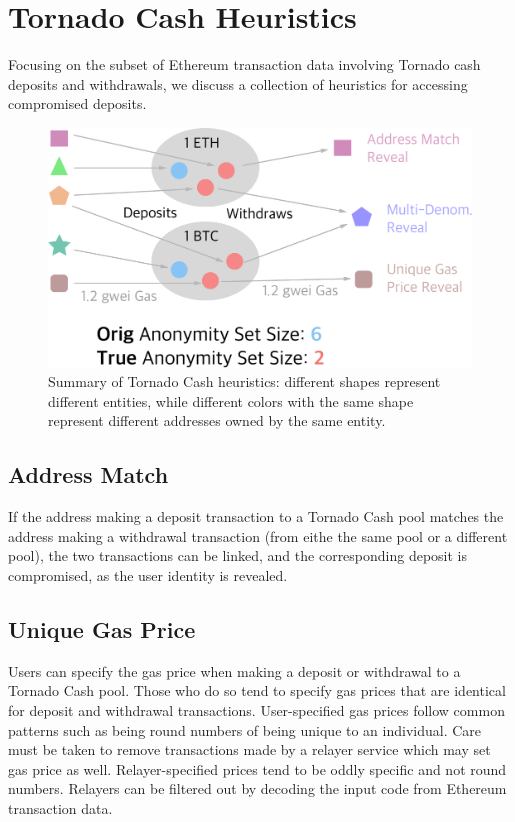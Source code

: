 \documentclass[11pt,a4paper]{article}
\begin{document}
\section{Tornado Cash Heuristics}
\label{sec:tornado}

Focusing on the subset of Ethereum transaction data involving Tornado cash deposits and withdrawals, we discuss a collection of heuristics for accessing compromised deposits.

\begin{figure}[b!]
\includegraphics[width=\linewidth]{figures/tornado.pdf}
\caption{Summary of Tornado Cash heuristics: different shapes represent different entities, while different colors with the same shape represent different addresses owned by the same entity.}
\label{fig:tornado}
\end{figure}

\subsection{Address Match}

If the address making a deposit transaction to a Tornado Cash pool matches the address making a withdrawal transaction (from eithe the same pool or a different pool), the two transactions can be linked, and the corresponding deposit is compromised, as the user identity is revealed.

\subsection{Unique Gas Price}

Users can specify the gas price when making a deposit or withdrawal to a Tornado Cash pool. Those who do so tend to specify gas prices that are identical for deposit and withdrawal transactions. User-specified gas prices follow common patterns such as being round numbers of being unique to an individual. Care must be taken to remove transactions made by a relayer service which may set gas price as well. Relayer-specified prices tend to be oddly specific and not round numbers. Relayers can be filtered out by decoding the input code from Ethereum transaction data.
\end{document}
